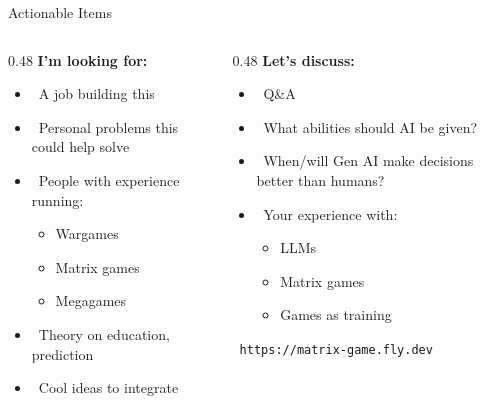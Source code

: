 \documentclass[aspectratio=169]{beamer}
\begin{document}
\begin{frame}{Actionable Items}
  \begin{columns}[T]
    \begin{column}{0.48\textwidth}
      \textbf{I'm looking for:}
      \begin{itemize}
        \item \faWrench~A job building this
        \item \faBriefcase~Personal problems this could help solve
        \item \faUsers~People with experience running:
          \begin{itemize}
            \item Wargames
            \item Matrix games
            \item Megagames
          \end{itemize}
        \item \faBook~Theory on education, prediction
        \item \faLightbulb~Cool ideas to integrate
      \end{itemize}
    \end{column}

    \begin{column}{0.48\textwidth}
      \textbf{Let's discuss:}
      \begin{itemize}
        \item \faQuestion~Q\&A
        \item \faBalanceScale~What abilities should AI be given?
        \item \faRobot~When/will Gen AI make decisions better than humans?
        \item \faComments~Your experience with:
          \begin{itemize}
            \item LLMs
            \item Matrix games
            \item Games as training
          \end{itemize}
      \end{itemize}

      \vspace{1em}
      \faLink~\texttt{https://matrix-game.fly.dev}
    \end{column}
  \end{columns}
\end{frame}
\end{document}
